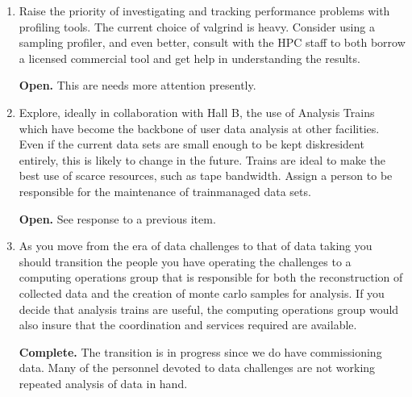 \documentclass[12pt]{article}
\begin{document}
\begin{enumerate}
  {\bf Open.} Planning is in early stages still.

\item Raise the priority of investigating and tracking performance
  problems with profiling tools. The current choice of valgrind is
  heavy. Consider using a sampling profiler, and even better, consult
  with the HPC staff to both borrow a licensed commercial tool and get
  help in understanding the results.

  {\bf Open.} This are needs more attention presently.

\item Explore, ideally in collaboration with Hall B, the use of
  Analysis Trains which have become the backbone of user data analysis
  at other facilities. Even if the current data sets are small enough
  to be kept disk­resident entirely, this is likely to change in the
  future. Trains are ideal to make the best use of scarce resources,
  such as tape bandwidth. Assign a person to be responsible for the
  maintenance of train­managed data sets.

  {\bf Open.} See response to a previous item.

\item As you move from the era of data challenges to that of data
  taking you should transition the people you have operating the
  challenges to a computing operations group that is responsible for
  both the reconstruction of collected data and the creation of monte
  carlo samples for analysis. If you decide that analysis trains are
  useful, the computing operations group would also insure that the
  coordination and services required are available.

  {\bf Complete.} The transition is in progress since we do have
  commissioning data. Many of the personnel devoted to data challenges
  are not working repeated analysis of data in hand.

\end{enumerate}
\end{document}
